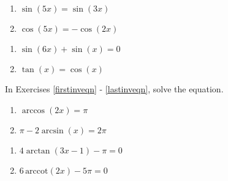 \begin{multicols}{2}

\begin{enumerate}

\setcounter{enumi}{\value{HW}}

\item $\sin(5x) = \sin(3x)$
\item $\cos(5x) = -\cos(2x)$

\setcounter{HW}{\value{enumi}}

\end{enumerate}

\end{multicols}

\begin{multicols}{2}
\begin{enumerate}
\setcounter{enumi}{\value{HW}}

\item $\sin(6x) + \sin(x) = 0$
\item $\tan(x) = \cos(x)$ \label{solvemoreidentlast}

\setcounter{HW}{\value{enumi}}
\end{enumerate}
\end{multicols}

In Exercises \ref{firstinveqn} - \ref{lastinveqn}, solve the equation.

\begin{multicols}{2}
\begin{enumerate}
\setcounter{enumi}{\value{HW}}

\item $\arccos(2x) = \pi$  \label{firstinveqn}  %
\item $\pi - 2\arcsin(x) = 2\pi$   %

\setcounter{HW}{\value{enumi}}
\end{enumerate}
\end{multicols}

\begin{multicols}{2}
\begin{enumerate}
\setcounter{enumi}{\value{HW}}

\item $4\arctan(3x-1)-\pi=0$   %
\item $6 \, \text{arccot}(2x) - 5\pi = 0$   %

\setcounter{HW}{\value{enumi}}
\end{enumerate}
\end{multicols}


